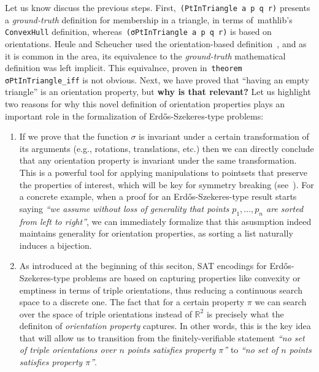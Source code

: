 Let us know discuss the previous steps. First,~\lstinline|(PtInTriangle a p q r)| presents a \emph{ground-truth}  definition for membership in a triangle, in terms of~\textsf{mathlib}'s \lstinline|ConvexHull| definition,  whereas~\lstinline|(σPtInTriangle a p q r)| is based on orientations. Heule and Scheucher used the orientation-based definition~\cite{emptyHexagonNumber}, and as it is common in the area, its equivalence to the \emph{ground-truth} mathematical definition was left implicit. This equivalnce, proven in~\lstinline|theorem σPtInTriangle_iff| is not obvious. Next, we have proved that ``having an empty triangle'' is an orientation property, but \textbf{why is that relevant?} Let us highlight two reasons for why this novel definition of orientation properties plays an important role in the formalization of Erd\H{o}s-Szekeres-type problems:
\begin{enumerate}
  \item If we prove that the function $\sigma$ is invariant under a certain transformation of its arguments (e.g., rotations, translations, etc.) then we can directly conclude that any orientation property is invariant under the same transformation. This is a powerful tool for applying manipulations to pointsets that preserve the properties of interest, which will be key for symmetry breaking (see~). For a concrete example, when a proof for an Erd\H{o}s-Szekeres-type result starts saying \emph{``we assume without loss of generality that points $p_1, \ldots, p_n$ are sorted from left to right''}, we can immediately formalize that this asusmption indeed maintains generality for orientation properties, as sorting a list naturally induces a bijection. 
  \item As introduced at the beginning of this seciton, SAT encodings for Erd\H{o}s-Szekeres-type problems are based on capturing properties like convexity or emptiness in terms of triple orientations, thus reducing a continuous search space to a discrete one. The fact that for a certain property $\pi$ we can search over the space of triple orientations instead of $\mathbb{R}^2$ is precisely what the definiton of \emph{orientation property} captures. In other words, this is the key idea that will allow us to transition from the finitely-verifiable statement \emph{``no set of triple orientations over $n$ points satisfies property $\pi$''} to \emph{``no set of $n$ points satisfies property $\pi$''}.
\end{enumerate}



